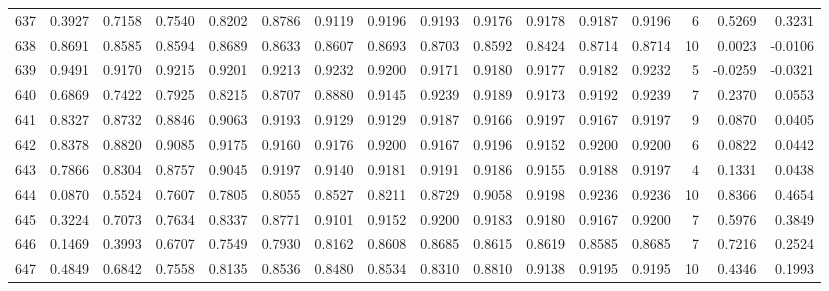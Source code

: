 \begin{tabular}{lrrrrrrrrrrrrrrr}
637 &      0.3927 &  0.7158 &  0.7540 &  0.8202 &  0.8786 &  0.9119 &  0.9196 &  0.9193 &  0.9176 &  0.9178 &   0.9187 &     0.9196 &      6 &                    0.5269 &                     0.3231 \\
638 &      0.8691 &  0.8585 &  0.8594 &  0.8689 &  0.8633 &  0.8607 &  0.8693 &  0.8703 &  0.8592 &  0.8424 &   0.8714 &     0.8714 &     10 &                    0.0023 &                    -0.0106 \\
639 &      0.9491 &  0.9170 &  0.9215 &  0.9201 &  0.9213 &  0.9232 &  0.9200 &  0.9171 &  0.9180 &  0.9177 &   0.9182 &     0.9232 &      5 &                   -0.0259 &                    -0.0321 \\
640 &      0.6869 &  0.7422 &  0.7925 &  0.8215 &  0.8707 &  0.8880 &  0.9145 &  0.9239 &  0.9189 &  0.9173 &   0.9192 &     0.9239 &      7 &                    0.2370 &                     0.0553 \\
641 &      0.8327 &  0.8732 &  0.8846 &  0.9063 &  0.9193 &  0.9129 &  0.9129 &  0.9187 &  0.9166 &  0.9197 &   0.9167 &     0.9197 &      9 &                    0.0870 &                     0.0405 \\
642 &      0.8378 &  0.8820 &  0.9085 &  0.9175 &  0.9160 &  0.9176 &  0.9200 &  0.9167 &  0.9196 &  0.9152 &   0.9200 &     0.9200 &      6 &                    0.0822 &                     0.0442 \\
643 &      0.7866 &  0.8304 &  0.8757 &  0.9045 &  0.9197 &  0.9140 &  0.9181 &  0.9191 &  0.9186 &  0.9155 &   0.9188 &     0.9197 &      4 &                    0.1331 &                     0.0438 \\
644 &      0.0870 &  0.5524 &  0.7607 &  0.7805 &  0.8055 &  0.8527 &  0.8211 &  0.8729 &  0.9058 &  0.9198 &   0.9236 &     0.9236 &     10 &                    0.8366 &                     0.4654 \\
645 &      0.3224 &  0.7073 &  0.7634 &  0.8337 &  0.8771 &  0.9101 &  0.9152 &  0.9200 &  0.9183 &  0.9180 &   0.9167 &     0.9200 &      7 &                    0.5976 &                     0.3849 \\
646 &      0.1469 &  0.3993 &  0.6707 &  0.7549 &  0.7930 &  0.8162 &  0.8608 &  0.8685 &  0.8615 &  0.8619 &   0.8585 &     0.8685 &      7 &                    0.7216 &                     0.2524 \\
647 &      0.4849 &  0.6842 &  0.7558 &  0.8135 &  0.8536 &  0.8480 &  0.8534 &  0.8310 &  0.8810 &  0.9138 &   0.9195 &     0.9195 &     10 &                    0.4346 &                     0.1993 \\

\end{tabular}

